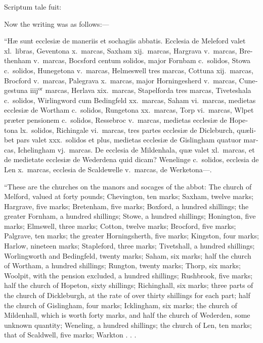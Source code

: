 \documentclass[10pt]{book}
\begin{document}
\begin{paracol}{2}
\switchcolumn*

\begin{otherlanguage}{latin}
Scriptum tale fuit:
\end{otherlanguage}

\switchcolumn

Now the writing was as follows:---

\switchcolumn*

\begin{otherlanguage}{latin}
``H\ae{} sunt ecclesi\ae{} de maneriis et sochagiis abbatis. Ecclesia de Meleford valet xl.\ libras, Geventona x.\ marcas, Saxham xij.\ marcas, Hargrava v.\ marcas, Brethenham v.\ marcas, Bocsford centum solidos, major Fornbam c.\ solidos, Stowa c.\ solidos, Hunegetona v.\ marcas, Helmeswell tres marcas, Cottuna xij.\ marcas, Brocford v.\ marcas, Palegrava x.\ marcas, major Horningesherd v.\ marcas, Cunegestuna iiij$^\text{or}$ marcas, Herlava xix.\ marcas, Stapelforda tres marcas, Tiveteshala c.\ solidos, Wirlingword cum Bedingfeld xx.\ marcas, Saham vi.\ marcas, medietas ecclesi\ae{} de Wortham c.\ solidos, Rungetona xx.\ marcas, Torp vi.\ marcas, Wlpet pr\ae{}ter pensionem c.\ solidos, Ressebroc v.\ marcas, medietas ecclesi\ae{} de Hopetona lx.\ solidos, Richingale vi.\ marcas, tres partes ecclesi\ae{} de Dicleburch, qu\ae{}libet pars valet xxx.\ solidos et plus, medietas ecclesi\ae{} de Gislingham quatuor marcas, Ichelingham vj.\ marcas. De ecclesia de Mildenhala, qu\ae{} valet xl.\ marcas, et de medietate ecclesi\ae{} de Wederdena quid dicam? Wenelinge c.\ solidos, ecclesia de Len x.\ marcas, ecclesia de Scaldewelle v.\ marcas, de Werketona---.
\end{otherlanguage}

\switchcolumn

``These are the churches on the manors and socages of the abbot: The church of Melford, valued at forty pounds; Chevington, ten marks; Saxham, twelve marks; Hargrave, five marks; Bretenham, five marks; Boxford, a hundred shillings; the greater Fornham, a hundred shillings; Stowe, a hundred shillings; Honington, five marks; Elmswell, three marks; Cotton, twelve marks; Brocford, five marks; Palgrave, ten marks; the greater Horningsherth, five marks; Kingston, four marks; Harlow, nineteen marks; Stapleford, three marks; Tivetshall, a hundred shillings; Worlingworth and Bedingfeld, twenty marks; Saham, six marks; half the church of Wortham, a hundred shillings; Rungton, twenty marks; Thorp, six marks; Woolpit, with the pension excluded, a hundred shillings; Rushbrook, five marks; half the church of Hopeton, sixty shillings; Richinghall, six marks; three parts of the church of Dickleburgh, at the rate of over thirty shillings for each part; half the church of Gislingham, four marks; Icklingham, six marks; the church of Mildenhall, which is worth forty marks, and half the church of Wederden, some unknown quantity; Weneling, a hundred shillings; the church of Len, ten marks; that of Scaldwell, five marks; Warkton . . .


\end{paracol}
\end{document}
